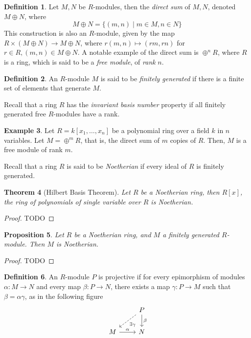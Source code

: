 \documentclass{amsart}
\newtheorem{theorem}{Theorem}[section]
\newtheorem{proposition}[theorem]{Proposition}
\theoremstyle{definition}
\newtheorem{definition}[theorem]{Definition}
\newtheorem{example}[theorem]{Example}
\theoremstyle{remark}
\numberwithin{equation}{section}
\begin{document}
\begin{definition}
  Let $M, N$ be $R$-modules, then the \emph{direct sum} of $M, N$, denoted $M \oplus N$, where
  \begin{equation*}
    M \oplus N = \{ (m, n) \mid m \in M, n \in N \}
  \end{equation*}
  This construction is also an $R$-module, given by the map $R \times (M \oplus N) \to M \oplus N$, where $r(m, n) \mapsto (rm, rn)$ for $r \in R, (m, n) \in M \oplus N$. A notable example of the direct sum is $\oplus^n R$, where $R$ is a ring, which is said to be a \emph{free module}, of \emph{rank} $n$.
\end{definition}

\begin{definition}
  An $R$-module $M$ is said to be \emph{finitely generated} if there is a finite set of elements that generate $M$.
\end{definition}

Recall that a ring $R$ has the \emph{invariant basis number} property if all finitely generated free $R$-modules have a rank.

\begin{example}
  Let $R = k[x_1, \dots, x_n]$ be a polynomial ring over a field $k$ in $n$ variables. Let $M = \oplus^m R$, that is, the direct sum of $m$ copies of $R$. Then, $M$ is a free module of rank $m$.
\end{example}

Recall that a ring $R$ is said to be \emph{Noetherian} if every ideal of $R$ is finitely generated.

\begin{theorem}[Hilbert Basis Theorem]
  Let $R$ be a Noetherian ring, then $R[x]$, the ring of polynomials of single variable over $R$ is Noetherian.
\end{theorem}

\begin{proof}
  TODO
\end{proof}

\begin{proposition}
  Let $R$ be a Noetherian ring, and $M$ a finitely generated $R$-module. Then $M$ is Noetherian.
\end{proposition}

\begin{proof}
  TODO
\end{proof}

\begin{definition}
  An $R$-module $P$ is projective if for every epimorphism of modules $\alpha: M \to N$ and every map $\beta: P \to N$, there exists a map $\gamma: P \to M$ such that $\beta = \alpha \gamma$, as in the following figure
  \begin{equation*}
    \begin{tikzcd}
      & P \arrow[dl, dashed]{}{\exists \gamma} \arrow[d]{}{\beta} \\
      M \arrow[r]{}{\alpha} & N
    \end{tikzcd}
  \end{equation*}
\end{definition}
\end{document}
